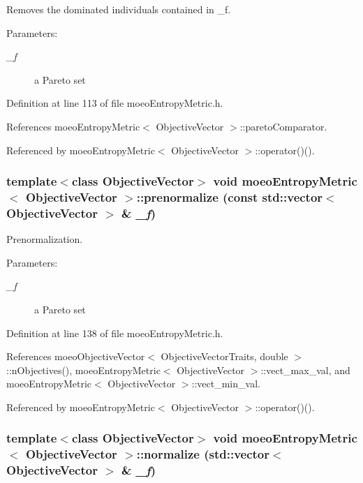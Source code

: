 Removes the dominated individuals contained in \_\-f. 

\begin{Desc}
\item[Parameters:]
\begin{description}
\item[{\em \_\-f}]a Pareto set \end{description}
\end{Desc}


Definition at line 113 of file moeo\-Entropy\-Metric.h.

References moeo\-Entropy\-Metric$<$ Objective\-Vector $>$::pareto\-Comparator.

Referenced by moeo\-Entropy\-Metric$<$ Objective\-Vector $>$::operator()().
\subsubsection{\setlength{\rightskip}{0pt plus 5cm}template$<$class Objective\-Vector$>$ void \bf{moeo\-Entropy\-Metric}$<$ \bf{Objective\-Vector} $>$::prenormalize (const std::vector$<$ \bf{Objective\-Vector} $>$ \& {\em \_\-f})\hspace{0.3cm}{\tt  [inline, private]}}\label{classmoeoEntropyMetric_51dd04bdd0ac6315f4f5956fb726cec1}


Prenormalization. 

\begin{Desc}
\item[Parameters:]
\begin{description}
\item[{\em \_\-f}]a Pareto set \end{description}
\end{Desc}


Definition at line 138 of file moeo\-Entropy\-Metric.h.

References moeo\-Objective\-Vector$<$ Objective\-Vector\-Traits, double $>$::n\-Objectives(), moeo\-Entropy\-Metric$<$ Objective\-Vector $>$::vect\_\-max\_\-val, and moeo\-Entropy\-Metric$<$ Objective\-Vector $>$::vect\_\-min\_\-val.

Referenced by moeo\-Entropy\-Metric$<$ Objective\-Vector $>$::operator()().
\subsubsection{\setlength{\rightskip}{0pt plus 5cm}template$<$class Objective\-Vector$>$ void \bf{moeo\-Entropy\-Metric}$<$ \bf{Objective\-Vector} $>$::normalize (std::vector$<$ \bf{Objective\-Vector} $>$ \& {\em \_\-f})\hspace{0.3cm}{\tt  [inline, private]}}\label{classmoeoEntropyMetric_2ed5771c3c611634b415f4be48cad172}


